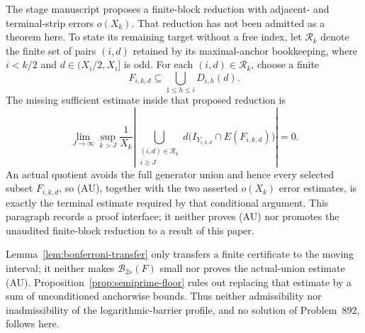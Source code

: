 \begin{remark}
The stage manuscript proposes a finite-block reduction with adjacent- and
terminal-strip errors $o(X_k)$.  That reduction has not been admitted as a
theorem here.  To state its remaining target without a free index, let
$\mathcal R_k$ denote the finite set of pairs $(i,d)$ retained by its
maximal-anchor bookkeeping, where $i<k/2$ and $d\in(X_i/2,X_i]$ is odd.
For each $(i,d)\in\mathcal R_k$, choose a finite
\[
 F_{i,k,d}\subseteq\bigcup_{1\leq h\leq i}D_{i,h}(d).
\]
The missing sufficient estimate inside that proposed reduction is
\[
 \lim_{J\to\infty}\sup_{k>J}\frac1{X_k}
 \left|\bigcup_{\substack{(i,d)\in\mathcal R_k\\i\geq J}}
 d\bigl(I_{Y_{i,k,d}}\cap E(F_{i,k,d})\bigr)\right|=0.
 \tag{AU}
\]
An actual quotient avoids the full generator union and hence every selected
subset $F_{i,k,d}$, so (AU), together with the two asserted $o(X_k)$ error
estimates, is exactly the terminal estimate required by that conditional
argument.  This paragraph records a proof interface; it neither proves (AU)
nor promotes the unaudited finite-block reduction to a result of this paper.
\end{remark}

Lemma~\ref{lem:bonferroni-transfer} only transfers a finite certificate to
the moving interval; it neither makes $\mathcal B_{2s}(F)$ small nor proves
the actual-union estimate (AU).
Proposition~\ref{prop:semiprime-floor} rules out replacing that estimate by
a sum of unconditioned anchorwise bounds.  Thus neither admissibility nor
inadmissibility of the logarithmic-barrier profile, and no solution of
Problem~892, follows here.
